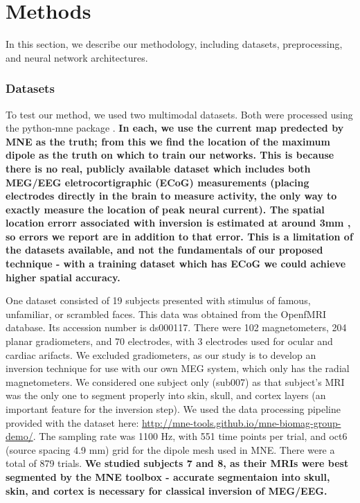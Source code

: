 \documentclass[journal]{IEEEtran}
\begin{document}
\section{Methods}

In this section, we describe our methodology, including datasets, preprocessing, and neural network architectures.

\subsubsection{Datasets}

To test our method, we used two multimodal datasets. Both were processed using the python-mne package \cite{gramfort2014mne}. \textbf{In each, we use the current map predected by MNE as the truth; from this we find the location of the maximum dipole as the truth on which to train our networks. This is because there is no real, publicly available dataset which includes both MEG/EEG eletrocortigraphic (ECoG) measurements (placing electrodes directly in the brain to measure activity, the only way to exactly measure the location of peak neural current). The spatial location errorr associated with inversion is estimated at around 3mm \cite{leahy1998study}, so errors we report are in addition to that error. This is a limitation of the datasets available, and not the fundamentals of our proposed technique - with a training dataset which has ECoG we could achieve higher spatial accuracy.}

One dataset \cite{wakeman2015multi} consisted of 19 subjects presented with stimulus of famous, unfamiliar, or scrambled faces. This data was obtained from the OpenfMRI database. Its accession number is ds000117. There were 102 magnetometers, 204 planar gradiometers, and 70 electrodes, with 3 electrodes used for ocular and cardiac arifacts. We excluded gradiometers, as our study is to develop an inversion technique for use with our own MEG system, which only has the radial magnetometers. We considered one subject only (sub007) as that subject's MRI was the only one to segment properly into skin, skull, and cortex layers (an important feature for the inversion step). We used the data processing pipeline provided with the dataset here: \url{http://mne-tools.github.io/mne-biomag-group-demo/}. The sampling rate was 1100 Hz, with 551 time points per trial, and oct6 (source spacing 4.9 mm) grid for the dipole mesh used in MNE. There were a total of 879 trials. \textbf{We studied subjects 7 and 8, as their MRIs were best segmented by the MNE toolbox - accurate segmentaion into skull, skin, and cortex is necessary for classical inversion of MEG/EEG.}
\end{document}
